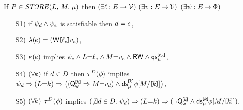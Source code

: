 \noindent
If $\aPS \in \sSTORE[\amode]{\cExp}{\aExp}$ then
$(\exists\cVal:\aEvs\fun\Val)$
$(\exists\aVal:\aEvs\fun\Val)$
$(\exists\bForm:\aEvs\fun\Formulae)$
\begin{enumerate}
\item[S1)] if $\bForm_\bEv\land\bForm_\aEv$ is satisfiable then $\bEv=\aEv$,
\item[S2)] $\labelingAct(\aEv) = \DWREFP{\cVal_\aEv}{\aVal_\aEv}$,
\item[S3)] 
  $\labelingForm(\aEv)$ implies
  \begin{math}
    \bForm_\aEv
    \land \cExp{=}\cVal_\aEv
    \land \aExp{=}\aVal_\aEv
    \land \RW
    \land \QS{\REF{\cVal_\aEv}}{\amode}
  \end{math},
\item[S4)]
  \begin{math}
    (\forall\dVal)
  \end{math}
  if
  $\bEv\in\bEvs$
  then
  $\aTr[\bEvs](\aForm)$ implies 
  \begin{math}
    \bForm_\bEv
    \limplies (\cExp{=}\dVal)
    \limplies \PBRbig{
      (\QwREF{\dVal} \limplies \aExp{=}\aVal_\bEv)
      \land \DS{\REF{\dVal}}{\amode}{\aForm[\aExp/\REF{\dVal}]}
    }
  \end{math},
\item[S5)] %
  \begin{math}
    (\forall\dVal)
  \end{math}
  $\aTr[\bEvs](\aForm)$ implies 
  \begin{math}
    (\not\exists\bEv\in\bEvs.\; \bForm_\bEv)
    \limplies (\cExp{=}\dVal)
    \limplies \PBR{
      \lnot\QwREF{\dVal}
      \land \DS{\REF{\dVal}}{\amode}{\aForm[\aExp/\REF{\dVal}]}
    }.
  \end{math}
\end{enumerate}
